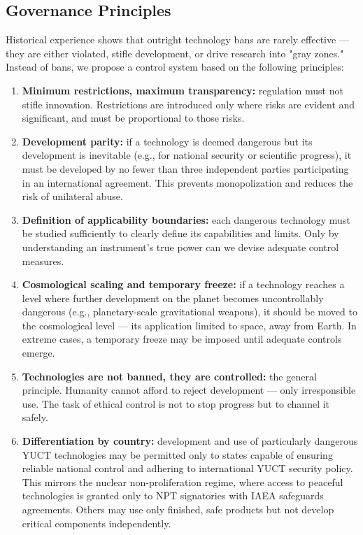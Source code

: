 \documentclass[12pt,a4paper]{article}
\theoremstyle{remark}
\begin{document}
	\subsection{Governance Principles}
	\label{subsec:principles}
	
	Historical experience shows that outright technology bans are rarely effective — they are either violated, stifle development, or drive research into "gray zones." Instead of bans, we propose a control system based on the following principles:
	
	\begin{enumerate}[leftmargin=*]
		\item \textbf{Minimum restrictions, maximum transparency:} regulation must not stifle innovation. Restrictions are introduced only where risks are evident and significant, and must be proportional to those risks.
		
		\item \textbf{Development parity:} if a technology is deemed dangerous but its development is inevitable (e.g., for national security or scientific progress), it must be developed by no fewer than three independent parties participating in an international agreement. This prevents monopolization and reduces the risk of unilateral abuse.
		
		\item \textbf{Definition of applicability boundaries:} each dangerous technology must be studied sufficiently to clearly define its capabilities and limits. Only by understanding an instrument's true power can we devise adequate control measures.
		
		\item \textbf{Cosmological scaling and temporary freeze:} if a technology reaches a level where further development on the planet becomes uncontrollably dangerous (e.g., planetary-scale gravitational weapons), it should be moved to the cosmological level — its application limited to space, away from Earth. In extreme cases, a temporary freeze may be imposed until adequate controls emerge.
		
		\item \textbf{Technologies are not banned, they are controlled:} the general principle. Humanity cannot afford to reject development — only irresponsible use. The task of ethical control is not to stop progress but to channel it safely.
		
		\item \textbf{Differentiation by country:} development and use of particularly dangerous YUCT technologies may be permitted only to states capable of ensuring reliable national control and adhering to international YUCT security policy. This mirrors the nuclear non-proliferation regime, where access to peaceful technologies is granted only to NPT signatories with IAEA safeguards agreements. Others may use only finished, safe products but not develop critical components independently.
	\end{enumerate}
	
\end{document}
